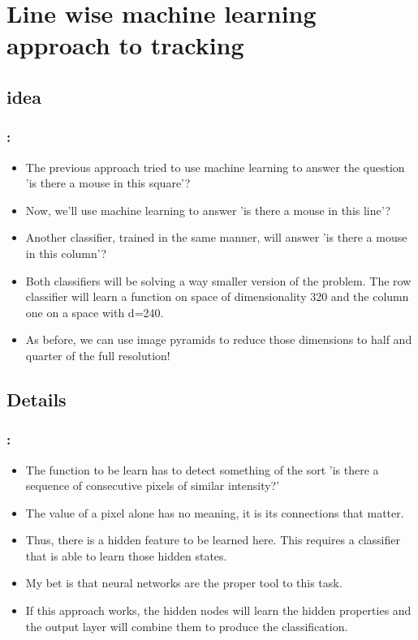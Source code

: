 \documentclass{beamer}
\begin{document}
\section{Line wise machine learning approach to tracking}
\subsection{idea}
\begin{frame}
  \frametitle{\secname : \subsecname}
  \begin{itemize}
      \item The previous approach tried to use machine learning to answer the question 'is there a mouse in this
        square'?
      \item Now, we'll use machine learning to answer 'is there a mouse in this line'?
      \item Another classifier, trained in the same manner, will answer 'is there a mouse in this column'?
      \item Both classifiers will be solving a way smaller version of the problem. The row classifier will learn a
        function on space of dimensionality 320 and the column one on a space with d=240.
      \item As before, we can use image pyramids to reduce those dimensions to half and quarter of the full resolution!
    \end{itemize}
\end{frame}

\subsection{Details}
\begin{frame}
  \frametitle{\secname : \subsecname}
  \begin{itemize}
      \item The function to be learn has to detect something of the sort 'is there a sequence of consecutive pixels of
        similar intensity?'
      \item The value of a pixel alone has no meaning, it is its connections that matter. 
      \item Thus, there is a hidden feature to be learned here. This requires a classifier that is able to learn those
        hidden states.
      \item My bet is that neural networks are the proper tool to this task.
      \item If this approach works, the hidden nodes will learn the hidden properties and the output layer will combine
        them to produce the classification.
    \end{itemize}
\end{frame}
\end{document}
